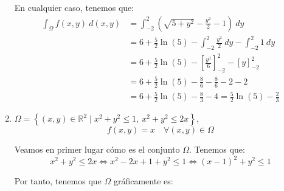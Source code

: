 \begin{ejercicio}
\begin{enumerate}
        En cualquier caso, tenemos que:
        \begin{align*}
            \int_{\Omega} f(x, y)~d(x, y)
            &= \int_{-2}^{2} \left( \sqrt{5 + y^2} -  \frac{y^2}{2} -1 \right)~dy \\
            &= 6 + \frac{5}{2}\ln(5) - \int_{-2}^{2} \frac{y^2}{2}~dy - \int_{-2}^{2} 1~dy \\
            &= 6 + \frac{5}{2}\ln(5) - \left[ \frac{y^3}{6} \right]_{-2}^{2} - \left[ y \right]_{-2}^{2} \\
            &= 6 + \frac{5}{2}\ln(5) - \frac{8}{6} - \frac{8}{6} -2 -2 \\
            &= 6 + \frac{5}{2}\ln(5) - \frac{8}{3} - 4 = \frac{5}{2}\ln(5) - \frac{2}{3}
        \end{align*}

        \item \(\Omega = \left\{ (x, y) \in \mathbb{R}^2 \mid x^2 + y^2 \leq 1,~x^2 + y^2 \leq 2x \right\} \),
        \[ f(x, y) = x \quad \forall (x, y) \in \Omega \]

        Veamos en primer lugar cómo es el conjunto $\Omega$. Tenemos que:
        \begin{equation*}
            x^2 + y^2 \leq 2x \iff
            x^2 - 2x + 1 + y^2 \leq 1 \iff
            (x-1)^2 + y^2 \leq 1
        \end{equation*}

        Por tanto, tenemos que $\Omega$ gráficamente es:
        \begin{figure}[H]
            \centering
        \end{figure}


\end{enumerate}
\end{ejercicio}
